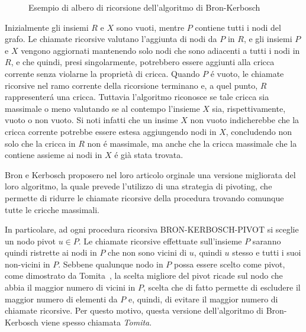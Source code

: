 \begin{figure}[H]
    \centering
    
    \caption{Esempio di albero di ricorsione dell'algoritmo di Bron-Kerbosch}
    \label{fig:bron_kerbosh_tree_example}
\end{figure}

Inizialmente gli insiemi $R$ e $X$ sono vuoti, mentre $P$ contiene tutti i nodi del grafo.
Le chiamate ricorsive valutano l'aggiunta di nodi da $P$ in $R$, e gli insiemi $P$ e $X$ vengono aggiornati
mantenendo solo nodi che sono adiacenti a tutti i nodi in $R$, e che quindi, presi singolarmente, potrebbero
essere aggiunti alla cricca corrente senza violarne la propriet\`a di cricca.
Quando $P$ \'e vuoto, le chiamate ricorsive nel ramo corrente della ricorsione terminano e, a quel punto,
$R$ rappresenter\'a una cricca.
Tuttavia l'algoritmo riconosce se tale cricca sia massimale o meno valutando se al contempo l'insieme $X$ sia,
rispettivamente, vuoto o non vuoto.
Si noti infatti che un insime $X$ non vuoto indicherebbe che la cricca corrente potrebbe essere estesa aggiungendo
nodi in $X$, concludendo non solo che la cricca in $R$ non \'e massimale, ma anche che la cricca massimale che
la contiene assieme ai nodi in $X$ \'e gi\`a stata trovata. \newline

Bron e Kerbosch proposero nel loro articolo orginale una versione migliorata del loro algoritmo, la quale
prevede l'utilizzo di una strategia di pivoting, che permette di ridurre le chiamate ricorsive della procedura
trovando comunque tutte le cricche massimali.



In particolare, ad ogni procedura ricorsiva BRON-KERBOSCH-PIVOT si sceglie un nodo pivot $u \in P$.
Le chiamate ricorsive effettuate sull'insieme $P$ saranno quindi ristrette ai nodi in $P$ che non sono vicini di $u$,
quindi $u$ stesso e tutti i suoi non-vicini in $P$.
Sebbene qualunque nodo in $P$ possa essere scelto come pivot, come dimostrato da Tomita~\cite{TOMITA200628},
la scelta migliore del pivot ricade sul nodo che abbia il maggior numero di vicini in $P$, scelta che di fatto
permette di escludere il maggior numero di elementi da $P$ e, quindi, di evitare il maggior numero di chiamate ricorsive.
Per questo motivo, questa versione dell'algoritmo di Bron-Kerbosch viene spesso chiamata \textit{Tomita}. \newline


